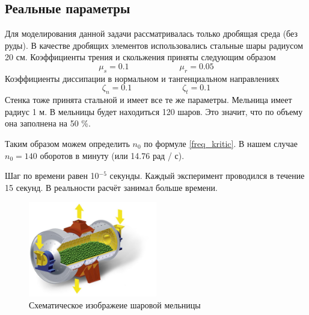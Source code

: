 \documentclass[utf8x, 14pt, oneside, a4paper]{article}
\begin{document}
\subsection{Реальные параметры}

Для моделирования данной задачи рассматривалась только дробящая среда (без руды). 
В качестве дробящих элементов использовались стальные шары радиусом 20 см.
Коэффициенты трения и скольжения приняты следующим образом
\[
\mu_s = 0.1 \qquad \qquad \qquad \mu_r = 0.05
\]
Коэффициенты диссипации в нормальном и тангенциальном направлениях
\[
\zeta_n = 0.1 \qquad \qquad \qquad \zeta_t = 0.1
\]
Стенка тоже принята стальной и имеет все те же параметры.
Мельница имеет радиус 1 м.
В мельницы будет находиться 120 шаров.
Это значит, что по объему она заполнена на 50 \%.

Таким образом можем определить $n_0$ по формуле \ref{freq_kritic}. 
В нашем случае $n_0 = 140$ оборотов в минуту (или 14.76 рад / с).

Шаг по времени равен 10$^{-5}$ секунды.
Каждый эксперимент  проводился в течение 15 секунд.
В реальности расчёт занимал больше времени.


\begin{figure}[H]
	\centering
	\includegraphics[width=0.5\textwidth]{mill_end} 
	\caption{Схематическое изображеие шаровой мельницы}
	\label{pic:mill_end}
\end{figure} 
\end{document}

